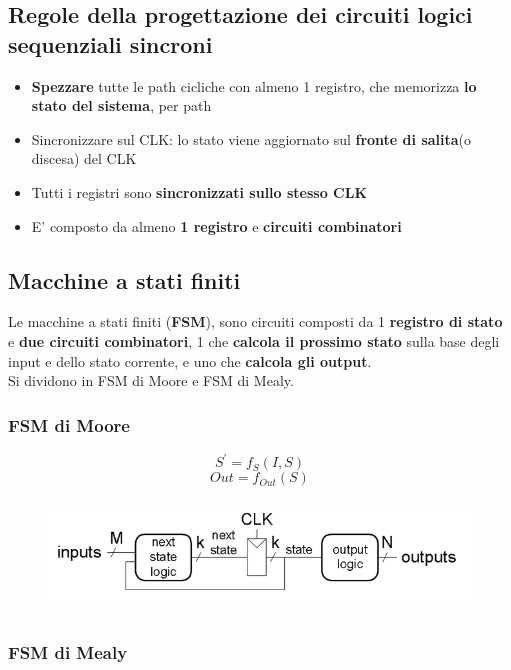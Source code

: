 \documentclass{report}
\begin{document}
    \subsection{Regole della progettazione dei circuiti logici sequenziali sincroni}
        \begin{itemize}
            \item \textbf{Spezzare} tutte le path cicliche con almeno 1 registro, 
                che memorizza \textbf{lo stato del sistema}, per path
            \item Sincronizzare sul CLK: lo stato viene aggiornato sul \textbf{fronte di salita}(o discesa) del CLK
            \item Tutti i registri sono \textbf{sincronizzati sullo stesso CLK}
            \item E' composto da almeno \textbf{1 registro} e \textbf{circuiti combinatori}
        \end{itemize}
    \subsection{Macchine a stati finiti}
        Le macchine a stati finiti (\textbf{FSM}), sono circuiti composti da 1
        \textbf{registro di stato} e \textbf{due circuiti combinatori}, 1 che 
        \textbf{calcola il prossimo stato} sulla base degli input e dello stato corrente,
        e uno che \textbf{calcola gli output}. \\
        Si dividono in FSM di Moore e FSM di Mealy.
        \subsubsection{FSM di Moore}
            $$S^{'} = f_{S}\left(I, S\right)$$
            $$Out = f_{Out}\left(S\right)$$
            \begin{center}
                \begin{figure}[H]
                    \includegraphics[width=\textwidth, height=3cm]{moorefsm.png}
                \end{figure}
            \end{center}
        \subsubsection{FSM di Mealy}
\end{document}
